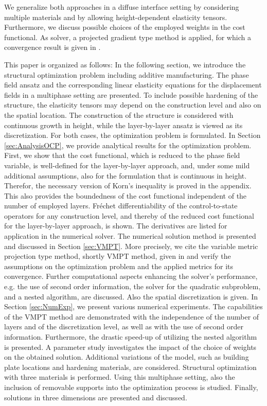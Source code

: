 \documentclass[a4paper,11pt]{article}
\theoremstyle{remark}
\begin{document}
We generalize both approaches in a diffuse interface setting by considering multiple materials and by allowing height-dependent elasticity tensors.
Furthermore, we discuss possible choices of the employed weights in the cost functional.
As solver, a projected gradient type method is applied, for which a convergence result is given in \cite{VMPT}.


\medskip
This paper is organized as follows:
In the following section, we introduce the structural optimization problem including additive manufacturing.
The phase field ansatz and the corresponding linear elasticity equations for the displacement fields in a multiphase setting are presented.
To include possible hardening of the structure, the elasticity tensors may depend on the construction level and also on the spatial location.
The construction of the structure is considered with continuous growth in height, while the layer-by-layer ansatz is viewed as its discretization. 
For both cases, the optimization problem is formulated.
In Section \ref{sec:AnalysisOCP}, we provide analytical results for the optimization problem.
First, we show that the cost functional, which is reduced to the phase field variable, is well-defined for the layer-by-layer approach, and, under some mild additional assumptions, also for the formulation that is continuous in height.
Therefor, the necessary version of Korn's inequality is proved in the appendix. 
This also provides the boundedness of the cost functional independent of the number of employed layers.
Fréchet differentiability of the control-to-state operators for any construction level, and thereby of the reduced cost functional for the layer-by-layer approach, is shown.
The derivatives are listed for application in the numerical solver.
The numerical solution method is presented and discussed in Section \ref{sec:VMPT}.
More precisely, we cite the variable metric projection type method, shortly VMPT method, given in \cite{VMPT} and verify the assumptions on the optimization problem and the applied metrics for its convergence.
Further computational aspects enhancing the solver's performance, e.g. the use of second order information, the solver for the quadratic subproblem, and a nested algorithm, are discussed. Also the spatial discretization is given.
In Section \ref{sec:NumExp}, we present various numerical experiments.
The capabilities of the VMPT method are demonstrated with the independence of the number of layers and of the discretization level, as well as with the use of second order information.
Furthermore, the drastic speed-up of utilizing the nested algorithm is presented.
A parameter study investigates the impact of the choice of weights on the obtained solution. 
Additional variations of the model, such as building plate locations and hardening materials, are considered.
Structural optimization with three materials is performed.
Using this multiphase setting, also the inclusion of removable supports into the optimization process is studied.
Finally, solutions in three dimensions are presented and discussed.
\end{document}
